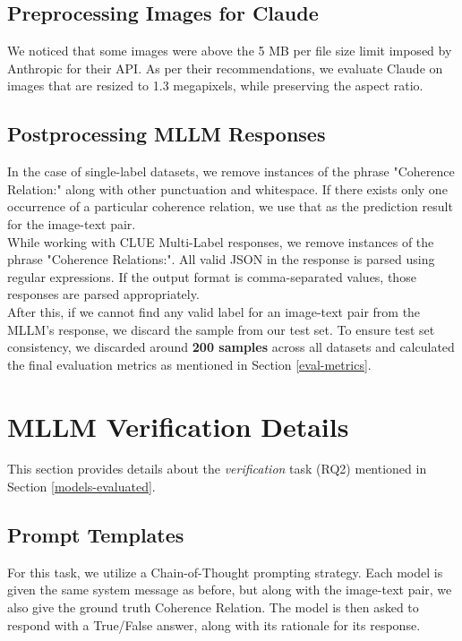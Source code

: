 \subsection{Preprocessing Images for Claude} \label{claude-preprocess}
We noticed that some images were above the 5 MB per file size limit imposed by Anthropic for their API. As per their recommendations, we evaluate Claude on images that are resized to 1.3 megapixels, while preserving the aspect ratio.

\subsection{Postprocessing MLLM Responses}
In the case of single-label datasets, we remove instances of the phrase "Coherence Relation:" along with other punctuation and whitespace. If there exists only one occurrence of a particular coherence relation, we use that as the prediction result for the image-text pair. \\

While working with CLUE Multi-Label responses, we remove instances of the phrase "Coherence Relations:". All valid JSON in the response is parsed using regular expressions. If the output format is comma-separated values, those responses are parsed appropriately. \\

After this, if we cannot find any valid label for an image-text pair from the MLLM's response, we discard the sample from our test set. To ensure test set consistency, we discarded around \textbf{200 samples} across all datasets and calculated the final evaluation metrics as mentioned in Section \ref{eval-metrics}.

\section{MLLM Verification Details} \label{appendix-verification}
This section provides details about the \textit{verification} task (RQ2) mentioned in Section \ref{models-evaluated}.

\subsection{Prompt Templates} \label{appendix-verify-prompts}
For this task, we utilize a Chain-of-Thought prompting strategy. Each model is given the same system message as before, but along with the image-text pair, we also give the ground truth Coherence Relation. The model is then asked to respond with a True/False answer, along with its rationale for its response. 

